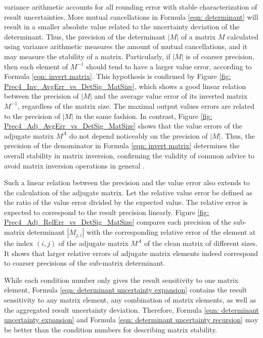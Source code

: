 \documentclass[twoside]{article}
\numberwithin{equation}{section}
\begin{document}
variance arithmetic accounts for all rounding error with stable characterization of result uncertainties.  More mutual cancellations in Formula \eqref{eqn: determinant} will result in a smaller absolute value related to the uncertainty deviation of the determinant.  Thus, the precision of the determinant $|M|$ of a matrix $M$ calculated using variance arithmetic measures the amount of mutual cancellations, and it may measure the stability of a matrix.  Particularly, if $|M|$ is of coarser precision, then each element of $M^{-1}$ should tend to have a larger value error, according to Formula \eqref{eqn: invert matrix}.  This hypothesis is confirmed by Figure \ref{fig: Prec4_Inv_AvgErr_vs_DetSig_MatSize}, which shows a good linear relation between the precision of $|M|$ and the average value error of its inverted matrix $M^{-1}$, regardless of the matrix size.  The maximal output values errors are related to the precision of $|M|$ in the same fashion.  In contrast, Figure \ref{fig: Prec4_Adj_AvgErr_vs_DetSig_MatSize} shows that the value errors of the adjugate matrix $M^{A}$ do not depend noticeably on the precision of $|M|$.  Thus, the precision of the denominator in Formula \eqref{eqn: invert matrix} determines the overall stability in matrix inversion, confirming the validity of common advice to avoid matrix inversion operations in general \cite{Numerical_Recipes}.

Such a linear relation between the precision and the value error also extends to the calculation of the adjugate matrix.  Let the relative value error be defined as the ratio of the value error divided by the expected value.  The relative error is expected to correspond to the result precision linearly.  Figure \ref{fig: Prec4_Adj_RelErr_vs_DetSig_MatSize} compares each precision of the sub-matrix determinant $|M_{j,i}|$ with the corresponding relative error of the element at the index $(i, j)$ of the adjugate matrix $M^{A}$ of the clean matrix of different sizes.  It shows that larger relative errors of adjugate matrix elements indeed correspond to coarser precisions of the sub-matrix determinant.   

While each condition number \cite{Condition_Number} only gives the result sensitivity to one matrix element, Formula \eqref{eqn: determinant uncertainty expansion} contains the result sensitivity to any matrix element, any combination of matrix elements, as well as the aggregated result uncertainty deviation.  Therefore, Formula \eqref{eqn: determinant uncertainty expansion} and Formula \eqref{eqn: determinant uncertainty recursion} may be better than the condition numbers for describing matrix stability. 
\end{document}
